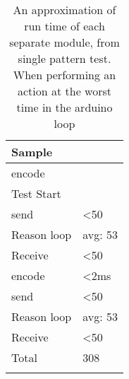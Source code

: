 \begin{center}
	\begin{table}[htbp]
	  \centering
	  \begin{tabular}{l | l}
		\toprule
		Sample  		& 			\\ \midrule
		encode 			& 		  	\\
		Test Start		&			\\
		send   			& <50  		\\
		Reason loop 	& avg: 53 	\\
		Receive 		& <50  		\\
		encode 			& <2ms  	\\
		send   			& <50  		\\
		Reason loop 	& avg: 53 	\\
		Receive 		& <50  		\\
		Total			& 308		\\
									\\ \bottomrule
	  \end{tabular}
	  \caption{An approximation of run time of each separate module, from single pattern test. When performing an action at the worst time in the arduino loop}
	\end{table}
 \label{Table:WorstRunTimeAprox}
\end{center}
